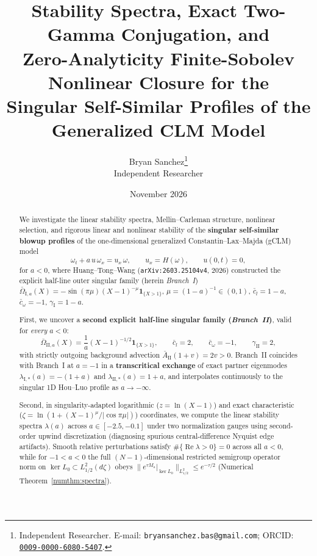 \documentclass[11pt,a4paper]{article}
\title{Stability Spectra, Exact Two-Gamma Conjugation, and\\
Zero-Analyticity Finite-Sobolev Nonlinear Closure for the\\
Singular Self-Similar Profiles of the Generalized CLM Model}
\author{
  Bryan Sanchez\thanks{Independent Researcher. E-mail: \texttt{bryansanchez.bas@gmail.com}; ORCID: \href{https://orcid.org/0009-0000-6080-5407}{\texttt{0009-0000-6080-5407}}.}\\
  \small Independent Researcher
}
\date{November 2026}
\begin{document}
\maketitle

\begin{abstract}
We investigate the linear stability spectra, Mellin--Carleman structure, nonlinear selection, and rigorous linear and nonlinear stability of the \textbf{singular self-similar blowup profiles} of the one-dimensional generalized Constantin--Lax--Majda (gCLM) model
\[
\omega_t + a\,u\,\omega_x = u_x\,\omega,\qquad u_x = H(\omega),\qquad u(0,t) = 0,
\]
for $a < 0$, where Huang--Tong--Wang (\texttt{arXiv:2603.25104v4}, 2026) constructed the explicit half-line outer singular family (herein \emph{Branch~I}) $\bar\Omega_{\mathrm{I},a}(X) = -\sin(\pi\mu)(X-1)^{-\mu}\mathbf{1}_{\{X>1\}}$, $\mu = (1-a)^{-1}\in(0,1)$, $\bar c_l = 1-a$, $\bar c_\omega = -1$, $\gamma_{\mathrm{I}} = 1-a$.

First, we uncover a \textbf{second explicit half-line singular family (\emph{Branch~II})}, valid for \emph{every} $a < 0$:
\[
\bar\Omega_{\mathrm{II},a}(X) = \frac{1}{a}(X-1)^{-1/2}\mathbf{1}_{\{X>1\}},\qquad \bar c_l = 2,\qquad \bar c_\omega = -1,\qquad \gamma_{\mathrm{II}} = 2,
\]
with strictly outgoing background advection $\bar A_{\mathrm{II}}(1+v) = 2v > 0$. Branch~II coincides with Branch~I at $a = -1$ in a \textbf{transcritical exchange} of exact partner eigenmodes $\lambda_{\mathrm{I},*}(a) = -(1+a)$ and $\lambda_{\mathrm{II},*}(a) = 1+a$, and interpolates continuously to the singular 1D Hou--Luo profile as $a \to -\infty$.

Second, in singularity-adapted logarithmic ($z = \ln(X-1)$) and exact characteristic ($\zeta = \ln(1 + (X-1)^\mu/|\cos\pi\mu|)$) coordinates, we compute the linear stability spectra $\lambda(a)$ across $a \in [-2.5, -0.1]$ under two normalization gauges using second-order upwind discretization (diagnosing spurious central-difference Nyquist edge artifacts). Smooth relative perturbations satisfy $\#\{\operatorname{Re}\lambda > 0\} = 0$ across all $a < 0$, while for $-1 < a < 0$ the full $(N-1)$-dimensional restricted semigroup operator norm on $\ker L_0 \subset L^2_{1/2}(d\zeta)$ obeys $\|e^{\tau M_a}|_{\ker L_0}\|_{L^2_{1/2}} \le e^{-\tau/2}$ (Numerical Theorem~\ref{numthm:spectra}).


\end{abstract}
\end{document}
